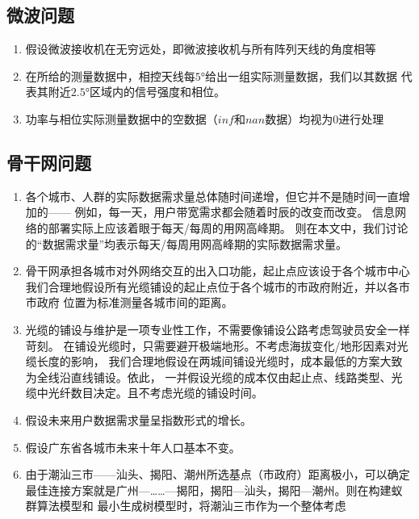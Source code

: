 \documentclass[UTF8,12pt]{ctexart}
\begin{document}
    \subsection{微波问题}
        \begin{enumerate}
            \item 假设微波接收机在无穷远处，即微波接收机与所有阵列天线的角度相等
            \item 在所给的测量数据中，相控天线每$5°$给出一组实际测量数据，我们以其数据
                代表其附近$2.5°$区域内的信号强度和相位。
            \item 功率与相位实际测量数据中的空数据（$inf$和$nan$数据）均视为0进行处理
        \end{enumerate}
    

    \subsection{骨干网问题}
        \begin{enumerate}
            \item 各个城市、人群的实际数据需求量总体随时间递增，但它并不是随时间一直增加的——
                例如，每一天，用户带宽需求都会随着时辰的改变而改变。
                信息网络的部署实际上应该着眼于每天/每周的用网高峰期。
                则在本文中，我们讨论的“数据需求量”均表示每天/每周用网高峰期的实际数据需求量。

            \item 骨干网承担各城市对外网络交互的出入口功能，起止点应该设于各个城市中心
                我们合理地假设所有光缆铺设的起止点位于各个城市的市政府附近，并以各市市政府
                位置为标准测量各城市间的距离。
            
            \item 光缆的铺设与维护是一项专业性工作，不需要像铺设公路考虑驾驶员安全一样苛刻。
                在铺设光缆时，只需要避开极端地形。不考虑海拔变化/地形因素对光缆长度的影响，
                我们合理地假设在两城间铺设光缆时，成本最低的方案大致为全线沿直线铺设。依此，
                一并假设光缆的成本仅由起止点、线路类型、光缆中光纤数目决定。且不考虑光缆的铺设时间。
            \item 假设未来用户数据需求量呈指数形式的增长。
            \item 假设广东省各城市未来十年人口基本不变。
            \item 由于潮汕三市——汕头、揭阳、潮州所选基点（市政府）距离极小，可以确定
                最佳连接方案就是广州—……—揭阳，揭阳—汕头，揭阳—潮州。则在构建蚁群算法模型和
                最小生成树模型时，将潮汕三市作为一个整体考虑
        \end{enumerate}
\end{document}
